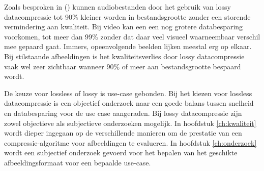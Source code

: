 Zoals besproken in  (\cite{kaur2016}) kunnen audiobestanden door het gebruik van \gls{lossy} \gls{datacompressie} tot 90\% kleiner worden in bestandsgrootte zonder een storende vermindering aan kwaliteit. Bij video kan een een nog grotere databesparing voorkomen, tot meer dan 99\% zonder dat daar veel visueel waarneembaar verschil mee gepaard gaat. Immers, opeenvolgende beelden lijken meestal erg op elkaar. Bij stilstaande afbeeldingen is het kwaliteitsverlies door \gls{lossy} \gls{datacompressie} vaak wel zeer zichtbaar wanneer 90\% of meer aan bestandsgrootte bespaard wordt.

De keuze voor \gls{lossless} of \gls{lossy} is \gls{use-case} gebonden. Bij het kiezen voor \gls{lossless} \gls{datacompressie} is een objectief onderzoek naar een goede balans tussen snelheid en databesparing voor de use case aangeraden. Bij \gls{lossy} \gls{datacompressie} zijn zowel objectieve als subjectieve onderzoeken mogelijk. In hoofdstuk \ref{ch:kwaliteit} wordt dieper ingegaan op de verschillende manieren om de prestatie van een \gls{compressie-algoritme} voor afbeeldingen te evalueren. In hoofdstuk \ref{ch:onderzoek} wordt een subjectief onderzoek gevoerd voor het bepalen van het geschikte \gls{afbeeldingsformaat} voor een bepaalde \gls{use-case}.

